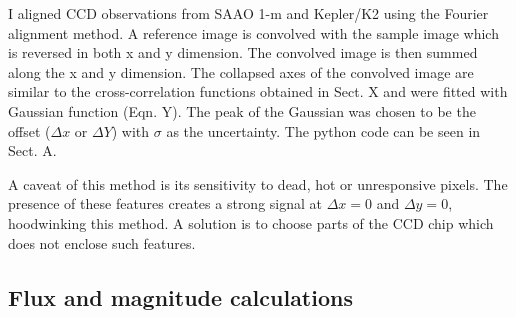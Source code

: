 I aligned CCD observations from SAAO 1-m and Kepler/K2 using the Fourier alignment method. A reference image is convolved with the sample image which is reversed in both x and y dimension. The convolved image is then summed along the x and y dimension. The collapsed axes of the convolved image are similar to the cross-correlation functions obtained in Sect. X and were fitted with Gaussian function (Eqn. Y). The peak of the Gaussian was chosen to be the offset ($\Delta x$ or $\Delta Y$) with $\sigma$ as the uncertainty. The python code can be seen in Sect. A. 

A caveat of this method is its sensitivity to dead, hot or unresponsive pixels. The presence of these features creates a strong signal at $\Delta x = 0$ and $\Delta y = 0$, hoodwinking this method. A solution is to choose parts of the CCD chip which does not enclose such features.  

\subsection{Flux and magnitude calculations}

